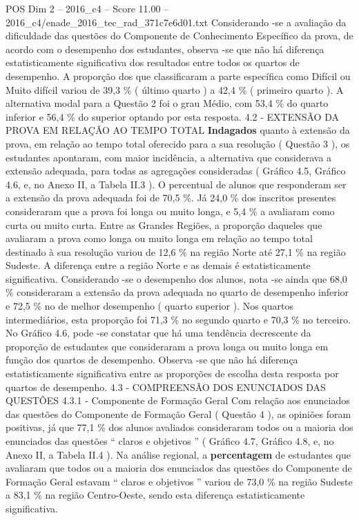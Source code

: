 \begin{textsample}{POS Dim 2 – 2016\_c4 – Score 11.00 – 2016\_c4/enade\_2016\_tec\_rad\_371c7e6d01.txt}
Considerando -se a avaliação da dificuldade das questões do Componente de Conhecimento Específico da prova, de acordo com o desempenho dos estudantes, observa -se que não há diferença estatisticamente significativa dos resultados entre todos os quartos de desempenho.
A proporção dos que classificaram a parte específica como Difícil ou Muito difícil variou de 39,3 \% ( último quarto ) a 42,4 \% ( primeiro quarto ).
A alternativa modal para a Questão 2 foi o grau Médio, com 53,4 \% do quarto inferior e 56,4 \% do superior optando por esta resposta. 4.2 - EXTENSÃO DA PROVA EM RELAÇÃO AO TEMPO TOTAL \textbf{Indagados} quanto à extensão da prova, em relação ao tempo total oferecido para a sua resolução ( Questão 3 ), os estudantes apontaram, com maior incidência, a alternativa que considerava a extensão adequada, para todas as agregações consideradas ( Gráfico 4.5, Gráfico 4.6, e, no Anexo II, a Tabela II.3 ).
O percentual de alunos que responderam ser a extensão da prova adequada foi de 70,5 \%.
Já 24,0 \% dos inscritos presentes consideraram que a prova foi longa ou muito longa, e 5,4 \% a avaliaram como curta ou muito curta.
Entre as Grandes Regiões, a proporção daqueles que avaliaram a prova como longa ou muito longa em relação ao tempo total destinado à sua resolução variou de 12,6 \% na região Norte até 27,1 \% na região Sudeste.
A diferença entre a região Norte e as demais é estatisticamente significativa.
Considerando -se o desempenho dos alunos, nota -se ainda que 68,0 \% consideraram a extensão da prova adequada no quarto de desempenho inferior e 72,5 \% no de melhor desempenho ( quarto superior ).
Nos quartos intermediários, esta proporção foi 71,3 \% no segundo quarto e 70,3 \% no terceiro.
No Gráfico 4.6, pode -se constatar que há uma tendência decrescente da proporção de estudantes que consideraram a prova longa ou muito longa em função dos quartos de desempenho.
Observa -se que não há diferença estatisticamente significativa entre as proporções de escolha desta resposta por quartos de desempenho. 4.3 - COMPREENSÃO DOS ENUNCIADOS DAS QUESTÕES 4.3.1 - Componente de Formação Geral Com relação aos enunciados das questões do Componente de Formação Geral ( Questão 4 ), as opiniões foram positivas, já que 77,1 \% dos alunos avaliados consideraram todos ou a maioria dos enunciados das questões “ claros e objetivos ” ( Gráfico 4.7, Gráfico 4.8, e, no Anexo II, a Tabela II.4 ).
Na análise regional, a \textbf{percentagem} de estudantes que avaliaram que todos ou a maioria dos enunciados das questões do Componente de Formação Geral estavam “ claros e objetivos ” variou de 73,0 \% na região Sudeste a 83,1 \% na região Centro-Oeste, sendo esta diferença estatisticamente significativa.

\end{textsample}
